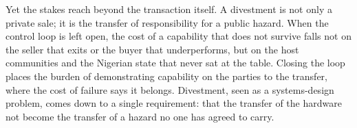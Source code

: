 Yet the stakes reach beyond the transaction itself. A divestment is not
only a private sale; it is the transfer of responsibility for a public
hazard. When the control loop is left open, the cost of a capability
that does not survive falls not on the seller that exits or the buyer
that underperforms, but on the host communities and the Nigerian state
that never sat at the table. Closing the loop places the burden of
demonstrating capability on the parties to the transfer, where the cost
of failure says it belongs. Divestment, seen as a systems-design
problem, comes down to a single requirement: that the transfer of the
hardware not become the transfer of a hazard no one has agreed to carry.


